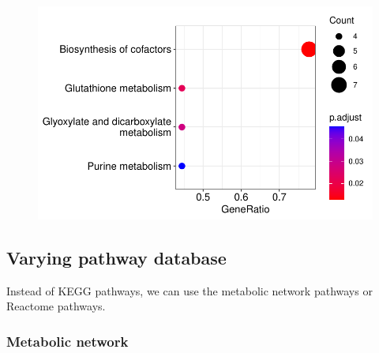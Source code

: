\documentclass[
  24px,
  letterpaper,
  DIV=11,
  numbers=noendperiod]{scrartcl}
\newenvironment{Shaded}{\begin{snugshade}}{\end{snugshade}}
\newcommand{\AttributeTok}[1]{\textcolor[rgb]{0.40,0.45,0.13}{#1}}
\newcommand{\FunctionTok}[1]{\textcolor[rgb]{0.28,0.35,0.67}{#1}}
\newcommand{\NormalTok}[1]{\textcolor[rgb]{0.00,0.23,0.31}{#1}}
\newcommand{\OtherTok}[1]{\textcolor[rgb]{0.00,0.23,0.31}{#1}}
\newcommand{\SpecialCharTok}[1]{\textcolor[rgb]{0.37,0.37,0.37}{#1}}
\begin{document}
\begin{figure}[H]

{\centering \includegraphics{index_files/figure-pdf/unnamed-chunk-17-1.pdf}

}

\end{figure}

\hypertarget{varying-pathway-database}{%
\subsection{Varying pathway database}\label{varying-pathway-database}}

Instead of KEGG pathways, we can use the metabolic network pathways or
Reactome pathways.

\hypertarget{metabolic-network-1}{%
\subsubsection{Metabolic network}\label{metabolic-network-1}}

\begin{Shaded}
\end{Shaded}
\end{document}
